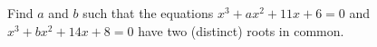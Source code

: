 Find $a$ and $b$ such that the equations $x^3+ax^2+11x+6=0$ and $x^3+bx^2+14x+8=0$ have two (distinct) roots in common.
